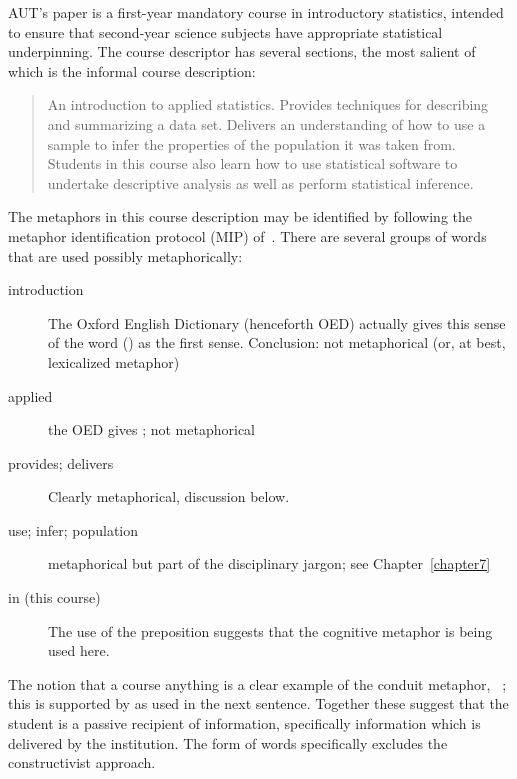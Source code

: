 AUT's  paper is a first-year mandatory course in
introductory statistics, intended to ensure that second-year science
subjects have appropriate statistical underpinning.  The course
descriptor has several sections, the most salient of which is the
informal course description: 

\begin{singlespace}
\begin{quote}
  An introduction to applied statistics.  Provides techniques for
  describing and summarizing a data set.  Delivers an understanding of
  how to use a sample to infer the properties of the population it was
  taken from.  Students in this course also learn how to use
  statistical software to undertake descriptive analysis as well as
  perform statistical inference.
\end{quote}
\end{singlespace}

The metaphors in this course description may be identified by
following the metaphor identification protocol (MIP)
of~.  There are several groups of words that
are used possibly metaphorically:

\begin{description}
\item[introduction] The Oxford English Dictionary (henceforth OED)
  actually gives this sense of the word () as the first sense.  Conclusion: not metaphorical (or,
  at best, lexicalized metaphor)
\item[applied] the OED gives ; not
  metaphorical
\item[provides; delivers]  Clearly metaphorical, discussion below.
\item[use; infer; population] metaphorical but part of the
  disciplinary jargon; see Chapter~\ref{chapter7}
\item[in (this course)] The use of the preposition 
  suggests that the cognitive metaphor 
  is being used here.
\end{description}

The notion that a course  anything is a clear
example of the conduit metaphor, ~\citep{reddy1993}; this is supported by
 as used in the next sentence.  Together these
suggest that the student is a passive recipient of information,
specifically information which is delivered by the institution.  The
form of words specifically excludes the constructivist approach.


